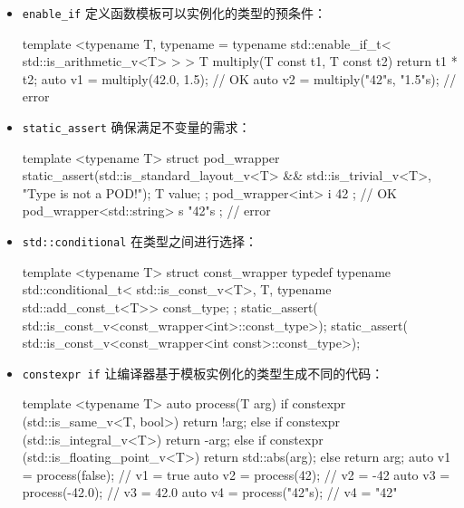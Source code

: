 \begin{itemize}
\item
\verb|enable_if| 定义函数模板可以实例化的类型的预条件：

\begin{cpp}
template <typename T,
          typename = typename std::enable_if_t<
                std::is_arithmetic_v<T> > >
T multiply(T const t1, T const t2)
{
    return t1 * t2;
}
auto v1 = multiply(42.0, 1.5);     // OK
auto v2 = multiply("42"s, "1.5"s); // error
\end{cpp}

\item
\verb|static_assert| 确保满足不变量的需求：

\begin{cpp}
template <typename T>
struct pod_wrapper
{
    static_assert(std::is_standard_layout_v<T> &&
                  std::is_trivial_v<T>,
                  "Type is not a POD!");
    T value;
};
pod_wrapper<int> i{ 42 };            // OK
pod_wrapper<std::string> s{ "42"s }; // error
\end{cpp}

\item
\verb|std::conditional| 在类型之间进行选择：

\begin{cpp}
template <typename T>
struct const_wrapper
{
    typedef typename std::conditional_t<
            std::is_const_v<T>,
            T,
            typename std::add_const_t<T>> const_type;
};
static_assert(
    std::is_const_v<const_wrapper<int>::const_type>);
static_assert(
    std::is_const_v<const_wrapper<int const>::const_type>);
\end{cpp}

\item
\verb|constexpr if| 让编译器基于模板实例化的类型生成不同的代码：

\begin{cpp}
template <typename T>
auto process(T arg)
{
    if constexpr (std::is_same_v<T, bool>)
        return !arg;
    else if constexpr (std::is_integral_v<T>)
        return -arg;
    else if constexpr (std::is_floating_point_v<T>)
        return std::abs(arg);
    else
        return arg;
}
auto v1 = process(false); // v1 = true
auto v2 = process(42);    // v2 = -42
auto v3 = process(-42.0); // v3 = 42.0
auto v4 = process("42"s); // v4 = "42"
\end{cpp}
\end{itemize}


